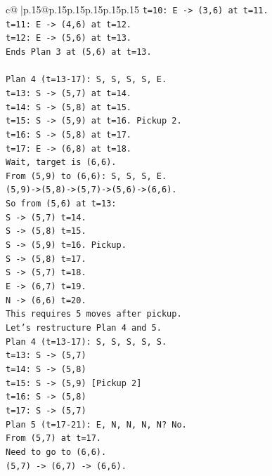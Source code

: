 \documentclass{article}
\begin{document}
{\begin{supertabular}{c@{$\;$}|p{.15\linewidth}@{}p{.15\linewidth}p{.15\linewidth}p{.15\linewidth}p{.15\linewidth}p{.15\linewidth}}
{{{\texttt{t=10: E {-}> (3,6) at t=11.} \\
\texttt{t=11: E {-}> (4,6) at t=12.} \\
\texttt{t=12: E {-}> (5,6) at t=13.} \\
\texttt{Ends Plan 3 at (5,6) at t=13.} \\
\\ 
\texttt{Plan 4 (t=13{-}17): S, S, S, S, E.} \\
\texttt{t=13: S {-}> (5,7) at t=14.} \\
\texttt{t=14: S {-}> (5,8) at t=15.} \\
\texttt{t=15: S {-}> (5,9) at t=16. Pickup 2.} \\
\texttt{t=16: S {-}> (5,8) at t=17.} \\
\texttt{t=17: E {-}> (6,8) at t=18.} \\
\texttt{Wait, target is (6,6).} \\
\texttt{From (5,9) to (6,6): S, S, S, E.} \\
\texttt{(5,9){-}>(5,8){-}>(5,7){-}>(5,6){-}>(6,6).} \\
\texttt{So from (5,6) at t=13:} \\
\texttt{S {-}> (5,7) t=14.} \\
\texttt{S {-}> (5,8) t=15.} \\
\texttt{S {-}> (5,9) t=16. Pickup.} \\
\texttt{S {-}> (5,8) t=17.} \\
\texttt{S {-}> (5,7) t=18.} \\
\texttt{E {-}> (6,7) t=19.} \\
\texttt{N {-}> (6,6) t=20.} \\
\texttt{This requires 5 moves after pickup.} \\
\texttt{Let's restructure Plan 4 and 5.} \\
\texttt{Plan 4 (t=13{-}17): S, S, S, S, S.} \\
\texttt{t=13: S {-}> (5,7)} \\
\texttt{t=14: S {-}> (5,8)} \\
\texttt{t=15: S {-}> (5,9) {[}Pickup 2{]}} \\
\texttt{t=16: S {-}> (5,8)} \\
\texttt{t=17: S {-}> (5,7)} \\
\texttt{Plan 5 (t=17{-}21): E, N, N, N, N? No.} \\
\texttt{From (5,7) at t=17.} \\
\texttt{Need to go to (6,6).} \\
\texttt{(5,7) {-}> (6,7) {-}> (6,6).} \\
}}}
\end{supertabular}}
\end{document}
